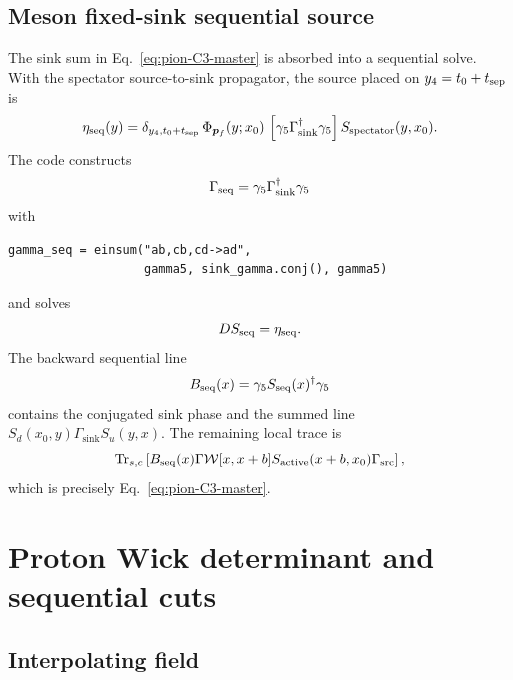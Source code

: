 \documentclass[11pt,a4paper]{article}
\numberwithin{equation}{section}
\newcommand{\Trsc}{\operatorname{Tr}_{s,c}}
\newcommand{\cW}{\mathcal{W}}
\newcommand{\Gsrc}{\Gamma_{\mathrm{src}}}
\newcommand{\Gsink}{\Gamma_{\mathrm{sink}}}
\begin{document}
\subsection{Meson fixed-sink sequential source}

The sink sum in Eq.~\eqref{eq:pion-C3-master} is absorbed into a sequential
solve.  With the spectator source-to-sink propagator, the source placed on
\(y_4=t_0+t_{\rm sep}\) is
\begin{equation}
 \eta_{\rm seq}(y)
 =\delta_{y_4,t_0+t_{\rm sep}}\,
 \Phi_{\boldsymbol p_f}(y;x_0)\,
 \left[\gamma_5\Gsink^\dagger\gamma_5\right]
 S_{\rm spectator}(y,x_0).
 \label{eq:meson-seq-source}
\end{equation}
The code constructs
\begin{equation}
 \Gamma_{\rm seq}
 =\gamma_5\Gsink^\dagger\gamma_5
\end{equation}
with
\begin{lstlisting}
gamma_seq = einsum("ab,cb,cd->ad",
                   gamma5, sink_gamma.conj(), gamma5)
\end{lstlisting}
and solves
\begin{equation}
 D S_{\rm seq}=\eta_{\rm seq}.
\end{equation}
The backward sequential line
\begin{equation}
 B_{\rm seq}(x)=\gamma_5S_{\rm seq}(x)^\dagger\gamma_5
\end{equation}
contains the conjugated sink phase and the summed line
\(S_d(x_0,y)\Gsink S_u(y,x)\).  The remaining local trace is
\begin{equation}
 \Trsc\left[
 B_{\rm seq}(x)\Gamma\cW[x,x+b]
 S_{\rm active}(x+b,x_0)\Gsrc
 \right],
 \label{eq:pion-C3-after-seq}
\end{equation}
which is precisely Eq.~\eqref{eq:pion-C3-master}.

\section{Proton Wick determinant and sequential cuts}

\subsection{Interpolating field}
\end{document}
